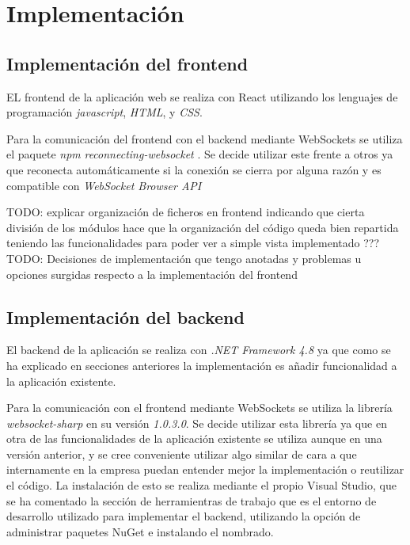 \chapter{Implementación}


\section{Implementación del frontend}

EL frontend de la aplicación web se realiza con React utilizando los lenguajes de programación \textit{javascript}, \textit{HTML}, y \textit{CSS}.

Para la comunicación del frontend con el backend mediante WebSockets se utiliza el paquete \textit{npm} \textit{reconnecting-websocket} \cite{reconect-ws}. Se decide utilizar este frente a otros ya que reconecta automáticamente si la conexión se cierra por alguna razón y es compatible con \textit{WebSocket Browser API} \cite{api-ws-front}\newline

TODO: explicar organización de ficheros en frontend indicando que cierta división de los módulos hace que la organización del código queda bien repartida teniendo las funcionalidades para poder ver a simple vista implementado ??? \\

TODO: Decisiones de implementación que tengo anotadas y problemas u opciones surgidas respecto a la implementación del frontend \\



\section{Implementación del backend}

El backend de la aplicación se realiza con \textit{.NET Framework 4.8} ya que como se ha explicado en secciones anteriores la implementación es añadir funcionalidad a la aplicación existente. \newline

Para la comunicación con el frontend mediante WebSockets se utiliza la librería \textit{websocket-sharp} \cite{websocket-sharp} en su versión \textit{1.0.3.0}.
Se decide utilizar esta librería ya que en otra de las funcionalidades de la aplicación existente se utiliza aunque en una versión anterior, y se cree conveniente utilizar algo similar de cara a que internamente en la empresa puedan entender mejor la implementación o reutilizar el código.
La instalación de esto se realiza mediante el propio Visual Studio, que se ha comentado la sección de herramientras de trabajo que es el entorno de desarrollo utilizado para implementar el backend, utilizando la opción de administrar paquetes NuGet e instalando el nombrado. \newline 

